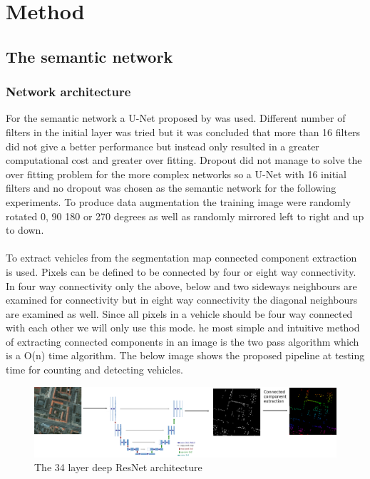 \documentclass{kththesis}
\begin{document}
\chapter{Method}
\section{The semantic network}
\subsection{Network architecture}
For the semantic network a U-Net proposed by \parencite{ronneberger_u-net:_2015} was used. Different number of filters in the initial layer was tried but it was concluded that more than 16 filters did not give a better performance but instead only resulted in a greater computational cost and greater over fitting. Dropout did not manage to solve the over fitting problem for the more complex networks so a U-Net with 16 initial filters and no dropout was chosen as the semantic network for the following experiments. To produce data augmentation the training image were randomly rotated 0, 90 180 or 270 degrees as well as randomly mirrored left to right and up to down.\\
\\
To extract vehicles from the segmentation map connected component extraction is used. Pixels can be defined to be connected by four or eight way connectivity. In four way connectivity only the above, below and two sideways neighbours are examined for connectivity but in eight way connectivity the diagonal neighbours are examined as well. Since all pixels in a vehicle should be four way connected with each other we will only use this mode. he most simple and intuitive method of extracting connected components in an image is the two pass algorithm \parencite{stockman_computer_2001} which is a O(n) time algorithm. The below image shows the proposed pipeline at testing time for counting and detecting vehicles.
\begin{figure}[H]
  \centering
      \includegraphics[scale=.16]{net}
  \caption{The 34 layer deep ResNet architecture \parencite{simonyan_very_2014}} \label{fig:vgg}
\end{figure}
\end{document}
